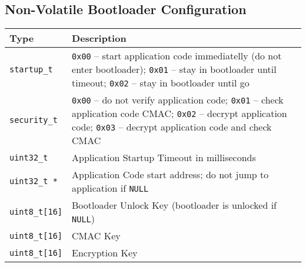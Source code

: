

\clearpage
\subsection{Non-Volatile Bootloader Configuration} \label{sec:arch:nvm}


\begin{table*}[!ht]
  \hspace*{-4cm}
  \begin{tabular}{| p{4cm} | p{9cm} | }
      \hline
      \rowcolor{SeaGreen3!30!} {\bf Type} & {\bf Description} \\
      \hline
      \hline
      {\tt startup\_t }  & {\tt 0x00} -- start application code immediatelly (do not enter bootloader);\newline
                          {\tt 0x01} -- stay in bootloader until timeout;\newline 
                          {\tt 0x02} -- stay in bootloader until go\\
      \hline
      {\tt security\_t } & {\tt 0x00} -- do not verify application code;\newline
                           {\tt 0x01} -- check application code CMAC;\newline 
                           {\tt 0x02} -- decrypt application code;\newline
                           {\tt 0x03} -- decrypt application code and check CMAC\\
      \hline
      {\tt uint32\_t}    & Application Startup Timeout in milliseconds \\
      \hline
      {\tt uint32\_t *}  & Application Code start address;\newline
                         do not jump to application if {\tt NULL} \\
      \hline
      {\tt uint8\_t[16]} & Bootloader Unlock Key (bootloader is unlocked if {\tt NULL}) \\
      \hline
      {\tt uint8\_t[16]} & CMAC Key \\
      \hline
      {\tt uint8\_t[16]} & Encryption Key \\
      \hline
  \end{tabular}
  \label{tab:cfgStruct}
 \end{table*}

